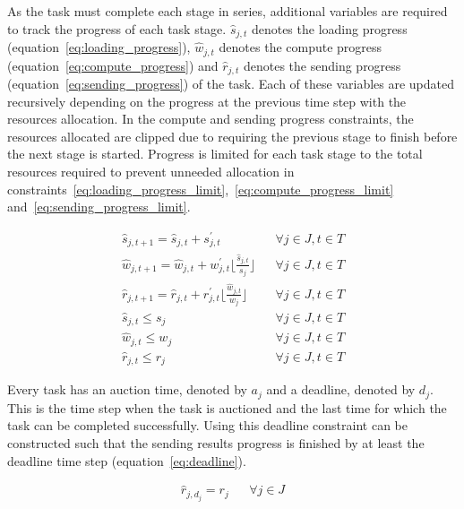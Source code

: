 As the task must complete each stage in series, additional variables are required to track the progress of
each task stage. $\hat{s}_{j,t}$ denotes the loading progress (equation~\eqref{eq:loading_progress}), $\hat{w}_{j,t}$
denotes the compute progress (equation~\eqref{eq:compute_progress}) and $\hat{r}_{j,t}$ denotes the sending progress
(equation~\eqref{eq:sending_progress}) of the task. Each of these variables are updated recursively depending
on the progress at the previous time step with the resources allocation. In the compute and sending
progress constraints, the resources allocated are clipped due to requiring the previous stage to finish before the next
stage is started. Progress is limited for each task stage to the total resources required to prevent unneeded
allocation in constraints~\eqref{eq:loading_progress_limit},~\eqref{eq:compute_progress_limit}
and~\eqref{eq:sending_progress_limit}.

\begin{align}
    \hat{s}_{j,t+1} = \hat{s}_{j,t} + s^{'}_{j,t} && \forall{j \in J, t \in T } \label{eq:loading_progress} \\
    \hat{w}_{j,t+1} = \hat{w}_{j,t} + w^{'}_{j,t} \lfloor{\frac{\hat{s}_{j,t}}{s_j}}\rfloor && \forall{j \in J, t \in T } \label{eq:compute_progress} \\
    \hat{r}_{j,t+1} = \hat{r}_{j,t} + r^{'}_{j,t} \lfloor{\frac{\hat{w}_{j,t}}{w_j}}\rfloor && \forall{j \in J, t \in T } \label{eq:sending_progress} \\
    \hat{s}_{j,t} \leq s_j && \forall{j \in J, t \in T} \label{eq:loading_progress_limit} \\
    \hat{w}_{j,t} \leq w_j && \forall{j \in J, t \in T} \label{eq:compute_progress_limit} \\
    \hat{r}_{j,t} \leq r_j && \forall{j \in J, t \in T} \label{eq:sending_progress_limit}
\end{align}

Every task has an auction time, denoted by $a_j$ and a deadline, denoted by $d_j$. This is the time step when the task
is auctioned and the last time for which the task can be completed successfully. Using this deadline constraint can be
constructed such that the sending results progress is finished by at least the deadline time step
(equation~\eqref{eq:deadline}).

\begin{align}
    \hat{r}_{j, d_j} = r_j && \forall{j \in J} \label{eq:deadline}
\end{align}

